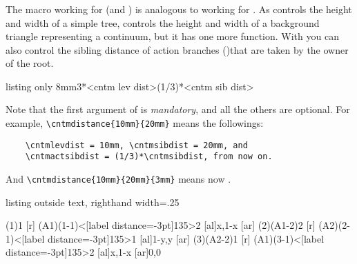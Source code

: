 \subsubsection{\protect\cmd{\cntmdistance}}
\label{page:cntmdistance}

The macro \icmd{\cntmdistance} working for \cmd{\istrootcntm} (and \cmd{\istrootcntmA}) is analogous to \cmd{\xdistance} working for \cmd{\istroot}.
As \cmd{\xtdistance} controls the height and width of a simple tree, \cmd{\cntmdistance} controls the height and width of a background triangle representing a continuum, but it has one more function.
With \icmd{\cntmdistance} you can also control the sibling distance of action branches (\emph{})that are taken by the owner of the root.

\begin{tcblisting}{listing only}
  {8mm}{3*<cntm lev dist>}{(1/3)*<cntm sib dist>}
\end{tcblisting}

Note that the first argument of \cmd{\cntmdistance} is \emph{mandatory}, and all the others are optional.
For example, \verb+\cntmdistance{10mm}{20mm}+ means the followings:
\begin{verbatim}
    \cntmlevdist = 10mm, \cntmsibdist = 20mm, and
    \cntmactsibdist = (1/3)*\cntmsibdist, from now on.
\end{verbatim}

And \verb+\cntmdistance{10mm}{20mm}{3mm}+ means now \cmd{\cntmactsibdist\ = 3mm}.


\begin{tcblisting}{listing outside text, righthand width=.25\linewidth}
\begin{istgame}[font=\scriptsize]
\xtdistance{10mm}{20mm}
\cntmdistance{10mm}{20mm}{3mm}
\istrootcntm(1){1} %
  [r] \istbm \endist
\istroot(A1)(1-1)<[label distance=-3pt]135>{2}
  [al]{x,1-x} [ar] \endist
\istrootcntm(2)(A1-2){2} %
  [r] \istbm \endist
\istroot(A2)(2-1)<[label distance=-3pt]135>{1}
  [al]{1-y,y} [ar] \endist
\istrootcntm(3)(A2-2){1} %
  [r] \istbm \endist
\istroot(A1)(3-1)<[label distance=-3pt]135>{2}
  [al]{x,1-x} [ar]{0,0} \endist
\end{istgame}
\end{tcblisting}


